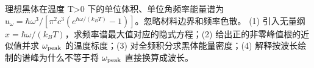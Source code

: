 理想黑体在温度 T>0 下的单位体积、单位角频率能量谱为 \(u_\omega=\hbar\omega^3/[\pi^2c^3(e^{\hbar\omega/(k_BT)}-1)]\)。忽略材料边界和频率色散。
(1) 引入无量纲 \(x=\hbar\omega/(k_BT)\)，求频率谱最大值对应的隐式方程；(2) 给出正的非零峰值根的近似值并求 \(\omega_{\rm peak}\) 的温度标度；(3) 对全频积分求黑体能量密度；(4) 解释按波长绘制的谱峰为什么不等于将 \(\omega_{\rm peak}\) 直接换算成波长。
